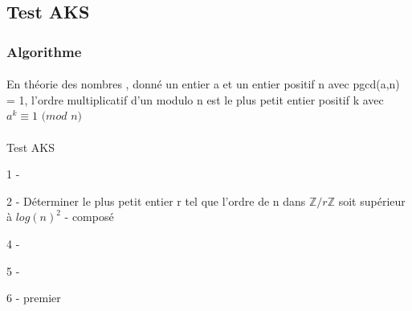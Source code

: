\subsection{Test AKS}
		

	\subsubsection{Algorithme}
		\paragraph{}
		\vspace{-1.5em}\begin{adjustwidth}{1.5cm}{1.5cm} 
		\begin{Def}
			\label{Ordre}
			En théorie des nombres , donné un entier a et un entier positif n avec pgcd(a,n) = 1, l'ordre multiplicatif d'un modulo n est le plus petit entier positif k avec $a^{k} \equiv 1$ $(mod$ $n)$
		\end{Def}
		\end{adjustwidth}\vspace{0.5em}
		
		\paragraph{}
		\vspace{-1.5em}\begin{adjustwidth}{1.5cm}{1.5cm} 
		\begin{algorithm}[H]
			\caption{Test AKS}\label{TAKS}
			
			1 - 
			
            2 - Déterminer le plus petit entier r tel que l’ordre de n dans $\mathbb{Z}/r\mathbb{Z}$ soit supérieur à $log(n)^{2}$ -  {\Retour composé\;}
            
            4 - 
            
            5 - 
            
			6 - \Retour premier\;
		\end{algorithm}
		\end{adjustwidth}\vspace{0.5em}
		
